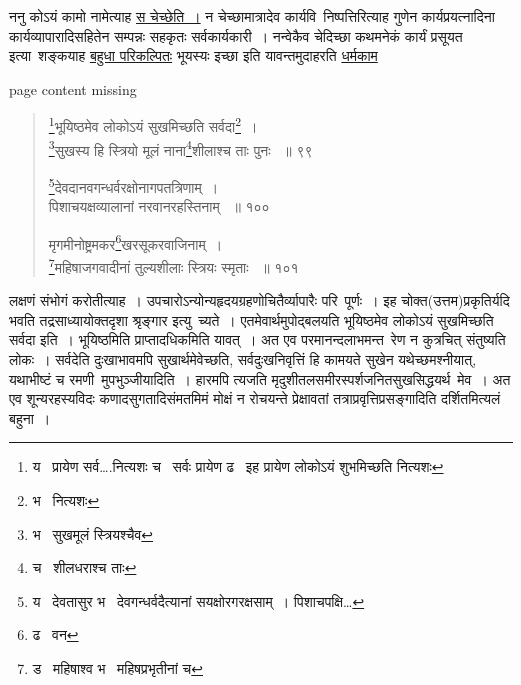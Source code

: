 \documentclass[11pt, openany]{book}
\begin{document}
{ननु कोऽयं कामो नामेत्याह \underline{स चेच्छेति~।} न चेच्छामात्रादेव कार्यवि\textendash\ निष्पत्तिरित्याह गुणेन कार्यप्रयत्नादिना कार्यव्यापारादिसहितेन सम्पन्नः सहकृतः सर्वकार्यकारी~। नन्वेकैव चेदिच्छा कथमनेकं कार्यं प्रसूयत इत्या\textendash\ शङ्कयाह \underline{बहुधा परिकल्पितः} भूयस्यः इच्छा इति यावन्तमुदाहरति \underline{धर्मकाम }


\newpage
page content missing 

\newpage

\lfoot{}

\begin{quote}
{\na \renewcommand{\thefootnote}{1}\footnote{य \textendash\ प्रायेण सर्व\ldots .नित्यशः च \textendash\ सर्वः प्रायेण ढ \textendash\ इह प्रायेण लोकोऽयं शुभमिच्छति नित्यशः }भूयिष्ठमेव लोकोऽयं सुखमिच्छति सर्वदा\renewcommand{\thefootnote}{2}\footnote{भ \textendash\ नित्यशः }~। \\
\renewcommand{\thefootnote}{3}\footnote{भ \textendash\ सुखमूलं स्त्रियश्चैव }सुखस्य हि स्त्रियो मूलं नाना\renewcommand{\thefootnote}{4}\footnote{च \textendash\ शीलधराश्च ताः}शीलाश्च ताः पुनः ~॥ ९९

\renewcommand{\thefootnote}{5}\footnote{य \textendash\ देवतासुर भ \textendash\ देवगन्धर्वदैत्यानां सयक्षोरगरक्षसाम्~। पिशाचपक्षि\ldots}देवदानवगन्धर्वरक्षोनागपतत्रिणाम्~।\\ 
पिशाचयक्षव्यालानां नरवानरहस्तिनाम् ~॥ १०० 

मृगमीनोष्ट्रमकर\renewcommand{\thefootnote}{6}\footnote{ढ \textendash\ वन }खरसूकरवाजिनाम्~।\\ 
\renewcommand{\thefootnote}{7}\footnote{ड \textendash\ महिषाश्व भ \textendash\ महिषप्रभृतीनां च }महिषाजगवादीनां तुल्यशीलाः स्त्रियः स्मृताः ~॥ १०१}
\end{quote}

\begin{sloppypar}
लक्षणं संभोगं करोतीत्याह~। उपचारोऽन्योन्यहृदयग्रहणोचितैर्व्यापारैः परि\textendash\ पूर्णः~। इह चोक्त(उत्तम)प्रकृतिर्यदि भवति तद्रसाध्यायोक्तदृशा श्रृङ्गार इत्यु\textendash\ च्यते~। एतमेवार्थमुपोद्बलयति भूयिष्ठमेव लोकोऽयं सुखमिच्छति सर्वदा इति~। भूयिष्ठमिति प्राप्तादधिकमिति यावत्~। अत एव परमानन्दलाभमन्त\textendash\ रेण न कुत्रचित् संतुष्यति लोकः~। सर्वदेति दुःखाभावमपि सुखार्थमेवेच्छति, सर्वदुःखनिवृत्तिं हि कामयते सुखेन यथेच्छमश्नीयात्, यथाभीष्टं च रमणी\textendash\ मुपभुञ्जीयादिति~। हारमपि त्यजति मृदुशीतलसमीरस्पर्शजनितसुखसिद्धयर्थ\textendash\ मेव~। अत एव शून्यरहस्यविदः कणादसुगतादिसंमतमिमं मोक्षं न रोचयन्ते प्रेक्षावतां तत्राप्रवृत्तिप्रसङ्गादिति दर्शितमित्यलं बहुना~। \\
\end{sloppypar}

}
\end{document}

